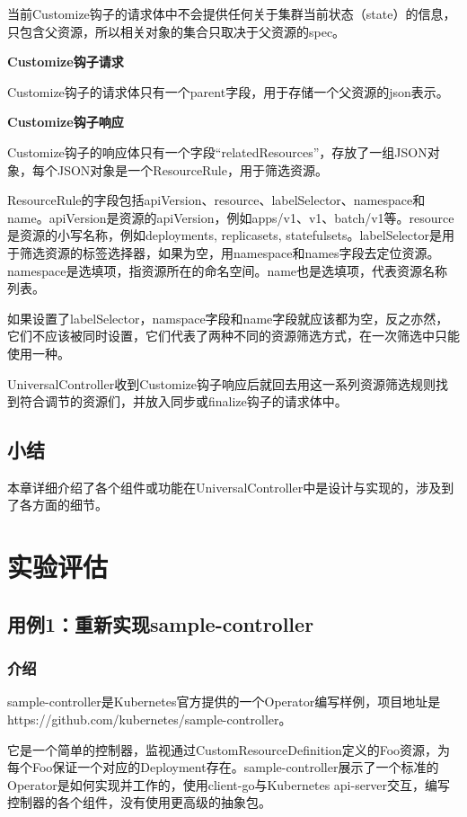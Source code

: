 \documentclass[macfonts,master]{njuthesis}
\begin{document}
当前Customize钩子的请求体中不会提供任何关于集群当前状态（state）的信息，只包含父资源，所以相关对象的集合只取决于父资源的spec。

\textbf{Customize钩子请求}

Customize钩子的请求体只有一个parent字段，用于存储一个父资源的json表示。

\textbf{Customize钩子响应}

Customize钩子的响应体只有一个字段``relatedResources''，存放了一组JSON对象，每个JSON对象是一个ResourceRule，用于筛选资源。

ResourceRule的字段包括apiVersion、resource、labelSelector、namespace和name。apiVersion是资源的apiVersion，例如apps/v1、v1、batch/v1等。resource是资源的小写名称，例如deployments, replicasets, statefulsets。labelSelector是用于筛选资源的标签选择器，如果为空，用namespace和names字段去定位资源。namespace是选填项，指资源所在的命名空间。name也是选填项，代表资源名称列表。

如果设置了labelSelector，namspace字段和name字段就应该都为空，反之亦然，它们不应该被同时设置，它们代表了两种不同的资源筛选方式，在一次筛选中只能使用一种。

UniversalController收到Customize钩子响应后就回去用这一系列资源筛选规则找到符合调节的资源们，并放入同步或finalize钩子的请求体中。

\section{小结}
本章详细介绍了各个组件或功能在UniversalController中是设计与实现的，涉及到了各方面的细节。

\chapter{实验评估}\label{chapter_experiments}
\section{用例1：重新实现sample-controller}\label{section:sample-controller}
\subsection{介绍}
sample-controller是Kubernetes官方提供的一个Operator编写样例，项目地址是https://github.com/kubernetes/sample-controller。

它是一个简单的控制器，监视通过CustomResourceDefinition定义的Foo资源，为每个Foo保证一个对应的Deployment存在。sample-controller展示了一个标准的Operator是如何实现并工作的，使用client-go与Kubernetes api-server交互，编写控制器的各个组件，没有使用更高级的抽象包。
\end{document}
